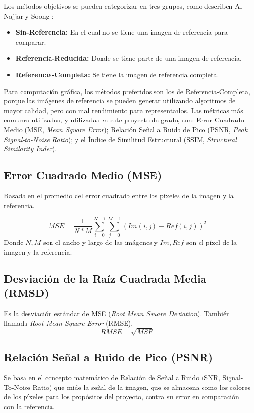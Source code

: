 \documentclass[pregrado]{tesis-usb} %
\begin{document}
Los métodos objetivos se pueden categorizar en tres grupos, como describen Al-Najjar y Soong \cite{Yusra2012}:

\begin{itemize}
	\item \textbf{Sin-Referencia:} En el cual no se tiene una imagen de referencia para comparar.
	\item \textbf{Referencia-Reducida:} Donde se tiene parte de una imagen de referencia.
	\item \textbf{Referencia-Completa:} Se tiene la imagen de referencia completa.
\end{itemize}



Para computación gráfica, los métodos preferidos son los de Referencia-Completa, porque las imágenes de referencia se pueden generar utilizando algoritmos de mayor calidad, pero con mal rendimiento para representarlos. Las métricas más comunes utilizadas, y utilizadas en este proyecto de grado, son: Error Cuadrado Medio (MSE, \textit{Mean Square Error}); Relación Señal a Ruido de Pico (PSNR, \textit{Peak Signal-to-Noise Ratio}); y el Índice de Similitud Estructural  (SSIM, \textit{Structural Similarity Index}).

\subsection{Error Cuadrado Medio (MSE)}
Basada en el promedio del error cuadrado entre los píxeles de la imagen y la referencia. 

\begin{equation}\label{eq:mse}
	MSE=\frac{1}{N*M}\sum\limits_{i=0}^{N-1}\sum\limits_{j=0}^{M-1}(Im(i,j)-Ref(i,j))^2
\end{equation}
Donde $N, M$ son el ancho y largo de las imágenes y $Im, Ref$ son el píxel de la imagen y la referencia.

\subsection{Desviación de la Raíz Cuadrada Media  (RMSD)}
Es la desviación estándar de MSE (\textit{Root Mean Square Deviation}). También llamada \textit{Root Mean Square Error} (RMSE).
\begin{equation}\label{eq:rmse}
RMSE=\sqrt{MSE}
\end{equation}

\subsection{Relación Señal a Ruido de Pico (PSNR)}
Se basa en el concepto matemático de Relación de Señal a Ruido (SNR, Signal-To-Noise Ratio) que mide la señal de la imagen, que se almacena como los colores de los píxeles para los propósitos del proyecto, contra su error en comparación con la referencia. \cite{Yusra2012}
\end{document}
